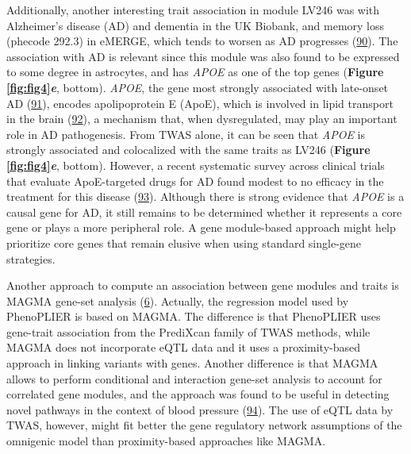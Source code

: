Additionally, another interesting trait association in module LV246 was with Alzheimer's disease (AD) and dementia in the UK Biobank, and memory loss (phecode 292.3) in eMERGE, which tends to worsen as AD progresses (\protect\hyperlink{ref-Vxi0ejah}{90}).
The association with AD is relevant since this module was also found to be expressed to some degree in astrocytes, and has \emph{APOE} as one of the top genes (\textbf{Figure \ref{fig:fig4}\emph{e}}, bottom).
\emph{APOE}, the gene most strongly associated with late-onset AD (\protect\hyperlink{ref-hn3T60wf}{91}), encodes apolipoprotein E (ApoE), which is involved in lipid transport in the brain (\protect\hyperlink{ref-10ZgydXh1}{92}), a mechanism that, when dysregulated, may play an important role in AD pathogenesis.
From TWAS alone, it can be seen that \emph{APOE} is strongly associated and colocalized with the same traits as LV246 (\textbf{Figure \ref{fig:fig4}\emph{e}}, bottom).
However, a recent systematic survey across clinical trials that evaluate ApoE-targeted drugs for AD found modest to no efficacy in the treatment for this disease (\protect\hyperlink{ref-UadQwQsF}{93}).
Although there is strong evidence that \emph{APOE} is a causal gene for AD, it still remains to be determined whether it represents a core gene or plays a more peripheral role.
A gene module-based approach might help prioritize core genes that remain elusive when using standard single-gene strategies.

Another approach to compute an association between gene modules and traits is MAGMA gene-set analysis (\protect\hyperlink{ref-19XiXgYmd}{6}).
Actually, the regression model used by PhenoPLIER is based on MAGMA.
The difference is that PhenoPLIER uses gene-trait association from the PrediXcan family of TWAS methods, while MAGMA does not incorporate eQTL data and it uses a proximity-based approach in linking variants with genes.
Another difference is that MAGMA allows to perform conditional and interaction gene-set analysis to account for correlated gene modules, and the approach was found to be useful in detecting novel pathways in the context of blood pressure (\protect\hyperlink{ref-Om8ZhS06}{94}).
The use of eQTL data by TWAS, however, might fit better the gene regulatory network assumptions of the omnigenic model than proximity-based approaches like MAGMA.

